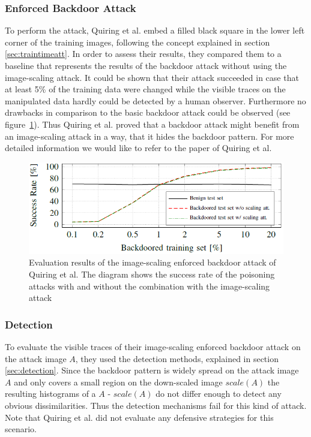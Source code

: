 \documentclass[sigconf]{acmart}
\begin{document}
\subsubsection{Enforced Backdoor Attack}
To perform the attack, Quiring et al. embed a filled black square in the lower left corner of the training images, following the concept explained in section \ref{sec:traintimeatt}.
In order to assess their results, they compared them to a baseline that represents the results of the backdoor attack without using the image-scaling attack.
It could be shown that their attack succeeded in case that at least 5\% of the training data were changed while the visible traces on the manipulated data hardly could be detected by a human observer.
Furthermore no drawbacks in comparison to the basic backdoor attack could be observed (see figure~\ref{fig:resBadNet}).
Thus Quiring et al. proved that a backdoor attack might benefit from an image-scaling attack in a way, that it hides the backdoor pattern.
For more detailed information we would like to refer to the paper of Quiring et al. \cite{imgscalepoison}

\begin{figure}[h]
  \centering
  \includegraphics[width=\linewidth]{img/resBadNet.png}
  \caption{Evaluation results of the image-scaling enforced backdoor attack of Quiring et al. The diagram shows the success rate of the poisoning attacks with and without the combination with the image-scaling attack \cite{imgscalepoison}}
  \Description{}
  \label{fig:resBadNet}
\end{figure}

\subsubsection{Detection}
To evaluate the visible traces of their image-scaling enforced backdoor attack on the attack image $A$, they used the detection methods, explained in section \ref{sec:detection}.
Since the backdoor pattern is widely spread on the attack image $A$ and only covers a small region on the down-scaled image $scale(A)$ the resulting histograms of a $A$ - $scale(A)$ do not differ enough to detect any obvious dissimilarities.
Thus the detection mechanisms fail for this kind of attack.
Note that Quiring et al. did not evaluate any defensive strategies for this scenario. 
\end{document}
